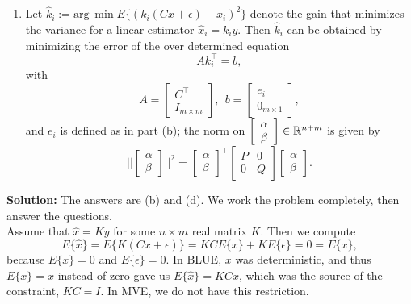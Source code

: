 {\begin{example}
\begin{enumerate}
\item Let $\widehat{k}_i := \text{arg}~ \min E\{ \left( k_i (Cx+\epsilon)  - x_i \right)^2 \} $ denote the gain that minimizes the variance for a linear estimator $\widehat{x}_i = k_i y$. Then $\widehat{k}_i$ can be obtained by minimizing the error of the over determined equation
    $$ A k_i^\top = b, $$
    with $$A=\left[\begin{array}{c}  C^\top \\ I_{m\times m}\end{array} \right],~~b=\left[\begin{array}{c}  e_i \\ 0_{m\times 1}\end{array} \right],$$
and $e_i$ is defined as in part (b); the norm on $\left[ \begin{array}{c} \alpha \\ \beta\end{array} \right] \in \mathbb R^{n+m}$ is given by $$||\left[ \begin{array}{c} \alpha \\ \beta\end{array} \right]||^2 = \left[ \begin{array}{c} \alpha \\ \beta\end{array} \right]^\top \left[ \begin{array}{cc}  P & 0  \\ 0& Q \end{array} \right] \left[ \begin{array}{c} \alpha \\ \beta\end{array} \right].$$


\end{enumerate}


\end{example}
\textbf{Solution:} The answers are (b) and (d).  We work the problem completely, then answer the questions. \\

Assume that $\widehat{x} = K y$ for some $n \times m$ real matrix $K$. Then we compute
$$ E\{\widehat{x}  \}  = E\{ K(Cx + \epsilon)  \} = KC E\{x  \}+ K E\{ \epsilon  \} =0 = E\{x  \},$$
because $E\{x  \}=0$ and $E\{ \epsilon  \}=0$. In BLUE, $x$ was deterministic, and thus $E\{x  \}=x$ instead of zero gave us $E\{\widehat{x}  \} = KC x$, which was the source of the constraint, $KC=I$. In MVE, we do not have this restriction.\\

}
